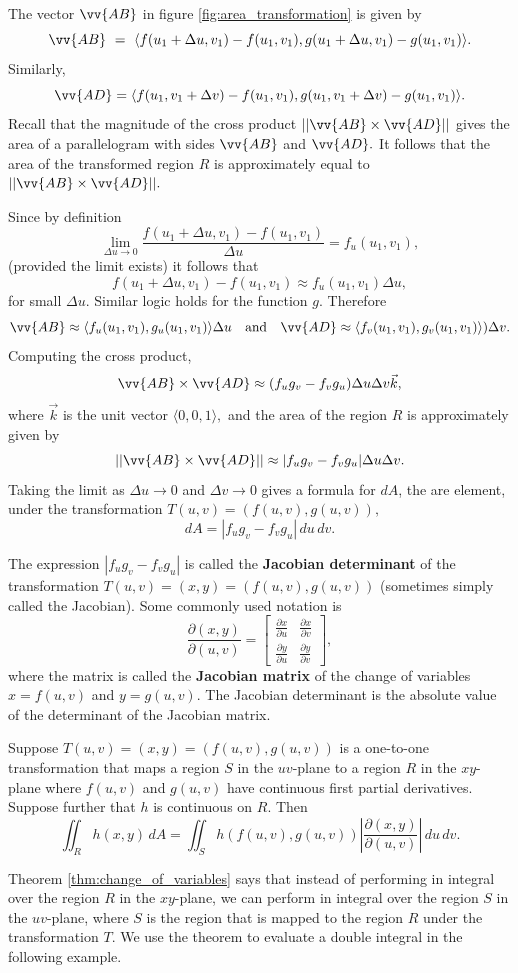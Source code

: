 The vector $\vv{AB}$ in figure \ref{fig:area_transformation} is given by \[\vv{AB}~=~\langle f(u_1+\Delta u,v_1)-f(u_1,v_1),g(u_1+\Delta u,v_1)-g(u_1,v_1)\rangle.\]  Similarly, \[\vv{AD} = \langle f(u_1,v_1 + \Delta v) - f(u_1,v_1), g(u_1,v_1 + \Delta v) - g(u_1,v_1)\rangle.\]  Recall that the magnitude of the cross product $||\vv{AB} \times \vv{AD}||$ gives the area of a parallelogram with sides $\vv{AB}$ and $\vv{AD}.$  It follows that the area of the transformed region $R$ is approximately equal to $||\vv{AB} \times \vv{AD}||.$

Since by definition
\[
	\lim_{\Delta u \to 0} \frac{f(u_1 + \Delta u, v_1) - f(u_1,v_1)}{\Delta u} = f_u(u_1,v_1),
\]
(provided the limit exists) it follows that
\[
	f(u_1 + \Delta u, v_1) - f(u_1,v_1) \approx f_u(u_1,v_1)\Delta u,
\]
for small $\Delta u.$ Similar logic holds for the function $g$.  Therefore
\[
	\vv{AB} \approx \langle f_u(u_1,v_1), g_u(u_1,v_1)\rangle \Delta u\quad \text{and}\quad \vv{AD} \approx \langle f_v(u_1,v_1),g_v(u_1,v_1)\rangle)\Delta v.
\]
Computing the cross product,
\[
	\vv{AB}\times\vv{AD} \approx (f_ug_v - f_vg_u)\Delta u\Delta v \vec{k},
\]
where $\vec{k}$ is the unit vector $\langle 0,0,1\rangle,$ and the area of the region $R$ is approximately given by
\[
	||\vv{AB}\times\vv{AD}|| \approx |f_ug_v - f_vg_u|\Delta u\Delta v.
\]
Taking the limit as $\Delta u \to 0$ and $\Delta v \to 0$ gives a formula for $dA$, the are element, under the transformation $T(u,v) = (f(u,v),g(u,v)),$
\[
	dA = |f_ug_v - f_vg_u|\,du\,dv.
\]

{The expression $|f_ug_v - f_vg_u|$ is called the \textbf{Jacobian determinant} of the transformation $T(u,v) = (x,y) = (f(u,v),g(u,v))$ (sometimes simply called the Jacobian). Some commonly used notation is
	\[
		\frac{\partial(x,y)}{\partial (u,v)} = \begin{bmatrix}\frac{\partial x}{\partial u} & \frac{\partial x}{\partial v}\\[.5em]
		\frac{\partial y}{\partial u} & \frac{\partial y}{\partial v} \end{bmatrix},
	\]
	where the matrix is called the \textbf{Jacobian matrix} of the change of variables $x = f(u,v)$ and $y = g(u,v).$ The Jacobian determinant is the absolute value of the determinant of the Jacobian matrix.
}

{Suppose $T(u,v) = (x,y) = (f(u,v),g(u,v))$ is a one-to-one transformation that maps a region $S$ in the $uv$-plane to a region $R$ in the $xy$-plane where $f(u,v)$ and $g(u,v)$ have continuous first partial derivatives.  Suppose further that $h$ is continuous on $R$. Then
	\[
		\iint_R h(x,y)\,dA = \iint_S h(f(u,v),g(u,v)) \left | \frac{\partial(x,y)}{\partial(u,v)} \right |\,du\,dv.
	\] 
}

Theorem \ref{thm:change_of_variables} says that instead of performing in integral over the region $R$ in the $xy$-plane, we can perform in integral over the region $S$ in the $uv$-plane, where $S$ is the region that is mapped to the region $R$ under the transformation $T$. We use the theorem to evaluate a double integral in the following example.
